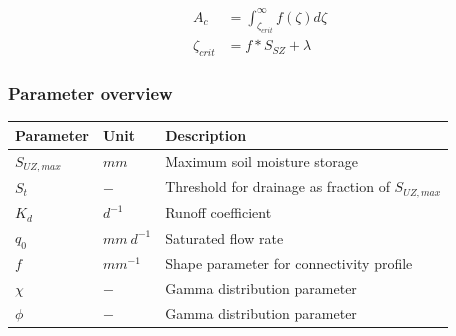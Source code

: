 \begin{align}
	A_c &= \int_{\zeta_{crit}}^{\infty}f(\zeta)d\zeta\\
	\zeta_{crit} &= f*S_{SZ} + \lambda
\end{align}

\newpage
\subsubsection{Parameter overview}
\begin{table}[htbp]
  \centering
    \begin{tabular}{lll}
    \toprule
    Parameter & Unit  & Description \\
    \midrule
    $S_{UZ,max}$ & $mm$  & Maximum soil moisture storage \\
    $S_t$ & $-$   & Threshold for drainage as fraction of $S_{UZ,max}$ \\
    $K_d$ & $d^{-1}$ & Runoff coefficient \\
    $q_0$ & $mm~d^{-1}$ & Saturated flow rate \\
    $f$   & $mm^{-1}$ & Shape parameter for connectivity profile \\
    $\chi$ & $-$   & Gamma distribution parameter \\
    $\phi$ & $-$   & Gamma distribution parameter \\
    \bottomrule
    \end{tabular}%
  \label{tab:addlabel}%
\end{table}%

